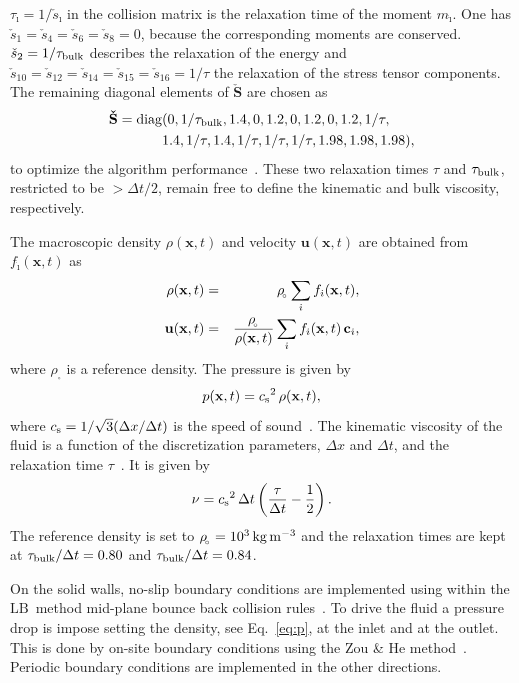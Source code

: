 \documentclass[aps,twocolumn,superscriptaddress,showpacs,showkeys]{revtex4-1}
\newcommand{\diag}{{\rm diag}}
\newcommand{\taub}{\tau_{\rm bulk}}
\newcommand{\ii}{{\dot{\imath}}}
\renewcommand{\c}{{\bf c}}
\newcommand{\ci}{\c_{\ii}}
\newcommand{\vbf}[1]{\mathbf{#1}}
\newcommand{\dt}{\Delta t}
\newcommand{\dx}{\Delta x}
\newcommand{\rhor}{{\rho\!_{_{\circ}}}}
\newcommand{\uvel}{\vbf{u}}
\newcommand{\x}{\vbf{x}}
\newcommand{\f}{f}
\newcommand{\fii}{\f_{\ii}}
\newcommand{\cs}{{c_{\rm s}}}
\newcommand{\LB}{\ensuremath{\text{LB}}}
\newcommand{\pwrr}[1]{10\sp{#1}}
\newcommand{\m}{m}
\newcommand{\mi}{\m_{\ii}}
\newcommand{\bfhS}{\vbf{\check{S}}}
\begin{document}
$\tau_{\ii}=1/\check{s}_{\ii}$ in the collision matrix is the relaxation time
of the moment $\mi$. One has
$\check{s}_{1}=\check{s}_{4}=\check{s}_{6}=\check{s}_{8}=0$, because the
corresponding moments are conserved. $\check{s}_{2}=1/\taub$ describes the
relaxation of the energy and
$\check{s}_{10}=\check{s}_{12}=\check{s}_{14}=\check{s}_{15}=\check{s}_{16}=1/
\tau$ the relaxation of the stress tensor components. The remaining diagonal
elements of $\bfhS$ are chosen as
%
\begin{equation}
\begin{split}
\bfhS = \diag & (0,1/\taub,1.4,0,1.2,0,1.2,0,1.2,1/\tau, \\
& 1.4,1/\tau,1.4,1/\tau,1/\tau,1/\tau,1.98,1.98,1.98),
\end{split}
\end{equation}
%
to optimize the algorithm
performance~\cite{2000PhRvE..61.6546L,2002RSPTA.360..437D}.  These two
relaxation times $\tau$ and $\taub$, restricted to be $>\dt/2$, remain free to
define the kinematic and bulk viscosity, respectively.

The macroscopic density $\rho(\x,t)$ and velocity $\uvel(\x,t)$ are obtained
from $\fii(\x,t)$ as
%
\begin{eqnarray}
\label{rho:eq}
\rho(\x,t) & = & \rhor \sum_{\ii} \fii(\x,t), \\
\label{uvel:eq}
\uvel(\x,t) & = &
\frac{\rhor}{\rho(\x,t)} \sum_{\ii}\fii(\x,t) \, \ci,
\end{eqnarray}
%
where $\rhor$ is a reference density. The pressure is given by
%
\begin{equation}
\label{eq:p}
p(\x,t) = {\cs}^{2} \, \rho(\x,t),
\end{equation}
%
where $\cs = 1/\sqrt{3}(\dx/\dt)$ is the speed of
sound~\cite{bib:qian-dhumieres-lallemand,bib:succi-01}. The kinematic
viscosity of the fluid is a function of the discretization parameters, $\dx$
and $\dt$, and the relaxation time
$\tau$~\cite{bib:chapman-cowling,Wolf05}. It is given by
%
\begin{equation}
\label{nu:eq}
\nu = \cs^2 \, \dt \left( \frac{\tau}{\dt} - \frac{1}{2} \right).
\end{equation}
%
The reference density is set to $\rhor = \pwrr{3}\,
\mathrm{kg}\,\mathrm{m}^{-3}$ and the relaxation times are kept at $\taub/\dt
= 0.80$ and $\taub/\dt = 0.84$.

On the solid walls, no-slip boundary conditions are implemented using within
the \LB\ method mid-plane bounce back collision
rules~\cite{SukopThorne2007}. To drive the fluid a pressure drop is impose
setting the density, see Eq.~\eqref{eq:p}, at the inlet and at the
outlet. This is done by on-site boundary conditions using the Zou \& He
method~\cite{bib:pf.QZoXHe.1997,HH08b}. Periodic boundary conditions are
implemented in the other directions.
\end{document}
